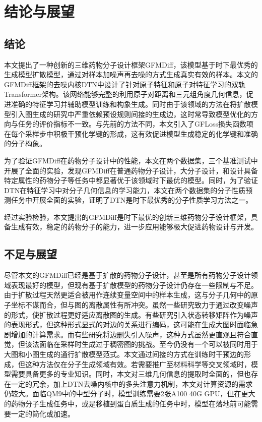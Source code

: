 \chapter{结论与展望}
\label{chap:conclusion}

\section{结论}
本文提出了一种创新的三维药物分子设计框架GFMDiff，该模型基于时下最优秀的生成模型扩散模型，通过对样本加噪声再去噪的方式生成真实有效的样本。本文的GFMDiff框架的去噪内核DTN中设计了针对原子特征和原子对特征学习的双轨Transformer架构。该网络能够完整的利用原子对距离和三元组角度几何信息，促进准确的特征学习并辅助模型训练和构象生成。同时由于该领域的方法在将扩散模型引入图生成的研究中严重依赖预设规则间接的生成边，这时常导致模型优化的方向与任务的评价指标不一致。与先前的方法不同，本文引入了GFLoss损失函数项在每个采样步中积极干预化学键的形成，这有效促进模型生成稳定的化学键和准确的分子构象。

为了验证GFMDiff在药物分子设计中的性能，本文在两个数据集，三个基准测试中开展了全面的实验，发现GFMDiff在普通药物分子设计，大分子设计，和设计具备特定属性的药物分子等任务中都显著优于该领域时下最优的模型。同时，为了验证DTN在特征学习中对分子几何信息的学习能力，本文在两个数据集的分子性质预测任务中开展全面的实验，证明了DTN是时下最优秀的分子性质学习方法之一。

经过实验检验，本文提出的GFMDiff是时下最优的创新三维药物分子设计框架，具备生成有效，稳定的药物分子的能力，进一步应用能够极大促进药物设计与开发。

\section{不足与展望}
尽管本文的GFMDiff已经是基于扩散的药物分子设计，甚至是所有药物分子设计领域表现最好的模型，但现有基于扩散模型的药物分子设计仍存在一些限制与不足。由于扩散过程天然更适合被用作连续变量空间中的样本生成，这与分子几何中的原子坐标不谋而合，但与图的离散属性有所冲突。虽然一些研究致力于通过改变噪声的形式，使扩散过程更好适应离散图的生成。有些研究引入状态转移矩阵作为噪声的表现形式，但这种形式显式的对边的关系进行编码，这可能在生成大图时面临急剧增加的计算需求。而有些研究将边删失引入噪声，这种方式虽然更直观且符合直觉，但该法面临在采样时生成过于稠密图的挑战。至今仍没有一个可以被同时用于大图和小图生成的通行扩散模型范式。本文通过间接的方式在训练时干预边的形成，但这种方法仅在分子生成领域有效。若需要推广至材料科学等交叉领域时，模型需要具备更多的专业知识。同时，本文对三维几何信息的提取时全面的，但也存在一定的冗余，加上DTN去噪内核中的多头注意力机制，本文对计算资源的需求仍较大。面临QM9中的中型分子时，模型训练需要2张A100 40G GPU，但在更大的药物分子生成任务中，或是移植到蛋白质生成的任务中时，模型在落地前可能需要一定的简化或加速。

